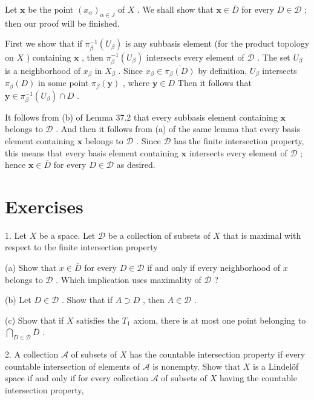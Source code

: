 Let \(\mathbf{x}\) be the point \({\left( {x}_{\alpha }\right) }_{\alpha  \in  J}\) of \(X\) . We shall show that \(\mathbf{x} \in  \bar{D}\) for every \(D \in  \mathcal{D}\) ; then our proof will be finished.

First we show that if \({\pi }_{\beta }^{-1}\left( {U}_{\beta }\right)\) is any subbasis element (for the product topology on \(X\) ) containing \(\mathbf{x}\) , then \({\pi }_{\beta }^{-1}\left( {U}_{\beta }\right)\) intersects every element of \(\mathcal{D}\) . The set \({U}_{\beta }\) is a neighborhood of \({x}_{\beta }\) in \({X}_{\beta }\) . Since \({x}_{\beta } \in  \overline{{\pi }_{\beta }\left( D\right) }\) by definition, \({U}_{\beta }\) intersects \({\pi }_{\beta }\left( D\right)\) in some point \({\pi }_{\beta }\left( \mathbf{y}\right)\) , where \(\mathbf{y} \in  D\) Then it follows that \(\mathbf{y} \in  {\pi }_{\beta }^{-1}\left( {U}_{\beta }\right)  \cap  D\) .

It follows from (b) of Lemma 37.2 that every subbasis element containing \(\mathbf{x}\) belongs to \(\mathcal{D}\) . And then it follows from (a) of the same lemma that every basis element containing \(\mathbf{x}\) belongs to \(\mathcal{D}\) . Since \(\mathcal{D}\) has the finite intersection property, this means that every basis element containing \(\mathbf{x}\) intersects every element of \(\mathcal{D}\) ; hence \(\mathbf{x} \in  \bar{D}\) for every \(D \in  \mathcal{D}\) as desired.

\section*{Exercises}

1. Let \(X\) be a space. Let \(\mathcal{D}\) be a collection of subsets of \(X\) that is maximal with respect to the finite intersection property

(a) Show that \(x \in  \bar{D}\) for every \(D \in  \mathcal{D}\) if and only if every neighborhood of \(x\) belongs to \(\mathcal{D}\) . Which implication uses maximality of \(\mathcal{D}\) ?

(b) Let \(D \in  \mathcal{D}\) . Show that if \(A \supset  D\) , then \(A \in  \mathcal{D}\) .

(c) Show that if \(X\) satisfies the \({T}_{1}\) axiom, there is at most one point belonging to \(\mathop{\bigcap }\limits_{{D \in  \mathcal{D}}}\bar{D}\) .

2. A collection \(\mathcal{A}\) of subsets of \(X\) has the countable intersection property if every countable intersection of elements of \(\mathcal{A}\) is nonempty. Show that \(X\) is a Lindelöf space if and only if for every collection \(\mathcal{A}\) of subsets of \(X\) having the countable intersection property,

